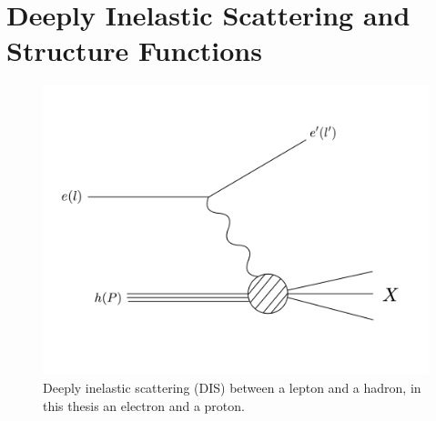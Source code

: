
%

\section{Deeply Inelastic Scattering and Structure Functions}

\begin{figure}
	\centering
	\includegraphics[width = \textwidth]{image/diagrams/dis-Feynman.png}	
	\caption[A diagrammatic representation of deeply inelastic scattering.]{Deeply inelastic scattering (DIS) between a lepton and a hadron, in this thesis an electron and a proton.}
	\label{fig:dis}
\end{figure}


